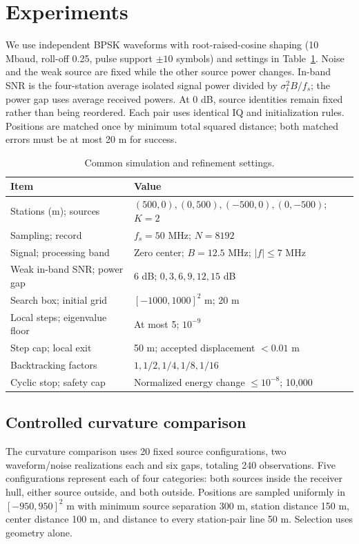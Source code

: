 \documentclass[a4paper,12pt,review]{cas-sc}
\begin{document}
\section{Experiments}
We use independent BPSK waveforms with root-raised-cosine shaping (10 Mbaud, roll-off 0.25, pulse support $\pm10$ symbols) and settings in Table~\ref{tab:settings}. Noise and the weak source are fixed while the other source power changes. In-band SNR is the four-station average isolated signal power divided by $\sigma_t^2B/f_s$; the power gap uses average received powers. At 0 dB, source identities remain fixed rather than being reordered. Each pair uses identical IQ and initialization rules. Positions are matched once by minimum total squared distance; both matched errors must be at most 20 m for success.
\begin{table}[pos=H]
\caption{Common simulation and refinement settings.}\label{tab:settings}
\centering
\begin{tabular}{ll}
\toprule
Item & Value \\
\midrule
Stations (m); sources & $(500,0),(0,500),(-500,0),(0,-500)$; $K=2$ \\
Sampling; record & $f_s=50$ MHz; $N=8192$ \\
Signal; processing band & Zero center; $B=12.5$ MHz; $|f|\le7$ MHz \\
Weak in-band SNR; power gap & 6 dB; $0,3,6,9,12,15$ dB \\
Search box; initial grid & $[-1000,1000]^2$ m; 20 m \\
Local steps; eigenvalue floor & At most 5; $10^{-9}$ \\
Step cap; local exit & 50 m; accepted displacement $<0.01$ m \\
Backtracking factors & $1,1/2,1/4,1/8,1/16$ \\
Cyclic stop; safety cap & Normalized energy change $\le10^{-8}$; 10,000 \\
\bottomrule
\end{tabular}
\end{table}

\subsection{Controlled curvature comparison}
The curvature comparison uses 20 fixed source configurations, two waveform/noise realizations each and six gaps, totaling 240 observations. Five configurations represent each of four categories: both sources inside the receiver hull, either source outside, and both outside. Positions are sampled uniformly in $[-950,950]^2$ m with minimum source separation 300 m, station distance 150 m, center distance 100 m, and distance to every station-pair line 50 m. Selection uses geometry alone.
\end{document}
